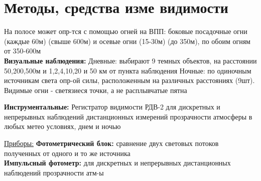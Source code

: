 
\section{Методы, средства изме видимости}
На полосе может опр-тся с помощью огней на ВПП: боковые посадочные огни (каждые 60м) (свыше 600м) и осевые огни (15-30м) (до 350м), по обоим огням  от 350-600м\\

\textbf{Визуальные наблюдения:}
Дневные: выбирают 9 темных объектов, на расстоянии 50,200,500м и 1,2,4,10,20 и 50 км от пункта наблюдения
Ночные: по одиночным источникам света опр-ой силы, расположенным на различных расстояниях (9шт). Видимые огни - светязиеся точки, а не расплывчатые пятна

\textbf{Инструментальные:} Регистратор видимости РДВ-2 для дискретных и непрерывных наблюдений дистанционных измерений прозрачности атмосферы в любых метео условиях, днем и ночью

\underline{Приборы:} \textbf{Фотометрический блок:} сравнение двух световых потоков полученных от одного и то же источника\\
\textbf{Импульсный фотометр:} для дискретных и непрерывных дистанционных наблюдений прозрачности атм-ы